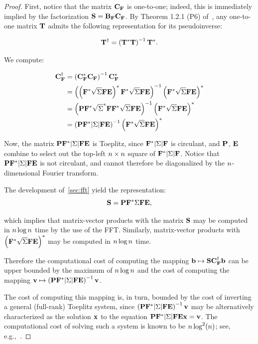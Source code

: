 \begin{proof}
First, notice that the matrix $\mathbf{C}_{\mathbf{F}}$ is one-to-one; indeed, this is immediately implied by the factorization $\mathbf{S} = \mathbf{B}_{\mathbf{F}} \mathbf{C}_{\mathbf{F}}$. By Theorem 1.2.1 (P6) of~\citep{nla.cat-vn1139431}, any one-to-one matrix $\mathbf{T}$ admits the following representation for its pseudoinverse:

\[
\mathbf{T}^\dagger = \left(\mathbf{T}^* \mathbf{T}\right)^{-1} \mathbf{T}^*.
\]

We compute:

\begin{align*}
    \mathbf{C}_{\mathbf{F}}^\dagger &= \left(\mathbf{C}_{\mathbf{F}}^* \mathbf{C}_{\mathbf{F}}\right)^{-1} \mathbf{C}_{\mathbf{F}}^* \\
    &=\left(\left(\mathbf{F}^* \sqrt{\Sigma} \mathbf{F}\mathbf{E}\right)^* \mathbf{F}^* \sqrt{\Sigma} \mathbf{F}\mathbf{E}\right)^{-1} \left(\mathbf{F}^* \sqrt{\Sigma} \mathbf{F}\mathbf{E}\right)^* \\
    &=\left(\mathbf{P} \mathbf{F}^* \sqrt{\Sigma}^* \mathbf{F} \mathbf{F}^* \sqrt{\Sigma} \mathbf{F}\mathbf{E}\right)^{-1} \left(\mathbf{F}^* \sqrt{\Sigma} \mathbf{F}\mathbf{E}\right)^*\\
    &=\left(\mathbf{P} \mathbf{F}^* |\Sigma| \mathbf{F}\mathbf{E}\right)^{-1} \left(\mathbf{F}^* \sqrt{\Sigma} \mathbf{F}\mathbf{E}\right)^*
\end{align*}

Now, the matrix $\mathbf{P} \mathbf{F}^* |\Sigma| \mathbf{F}\mathbf{E}$ is Toeplitz, since $\mathbf{F}^* |\Sigma| \mathbf{F}$ is circulant, and $\mathbf{P}$, $\mathbf{E}$ combine to select out the top-left $n \times n$ square of $\mathbf{F}^* |\Sigma| \mathbf{F}$. Notice that $\mathbf{P} \mathbf{F}^* |\Sigma| \mathbf{F}\mathbf{E}$ is not circulant, and cannot therefore be diagonalized by the $n$-dimensional Fourier transform.

The development of~\cref{sec:fft} yield the representation:
\[
\mathbf{S} = \mathbf{P} \mathbf{F}^* \Sigma \mathbf{F} \mathbf{E},
\]

which implies that matrix-vector products with the matrix $\mathbf{S}$ may be computed in $n\log n$ time by the use of the FFT. Similarly, matrix-vector products with $\left(\mathbf{F}^* \sqrt{\Sigma} \mathbf{F}\mathbf{E}\right)^*$ may be computed in $n\log n$ time.

Therefore the computational cost of computing the mapping $\mathbf{b} \mapsto \mathbf{S}\mathbf{C}_{\mathbf{F}}^\dagger\mathbf{b}$ can be upper bounded by the maximum of $n\log n$ and the cost of computing the mapping $\mathbf{v} \mapsto \left(\mathbf{P} \mathbf{F}^* |\Sigma| \mathbf{F}\mathbf{E}\right)^{-1} \mathbf{v}$.

The cost of computing this mapping is, in turn, bounded by the cost of inverting a general (full-rank) Toeplitz system, since  $\left(\mathbf{P} \mathbf{F}^* |\Sigma| \mathbf{F}\mathbf{E}\right)^{-1} \mathbf{v}$ may be alternatively characterized as the solution $\mathbf{x}$ to the equation $\mathbf{P} \mathbf{F}^* |\Sigma| \mathbf{F}\mathbf{E}\mathbf{x} = \mathbf{v}$. The computational cost of solving such a system is known to be $n\log^2(n)$; see, e.g.,~\citep{invert_toeplitz}.
\end{proof}


